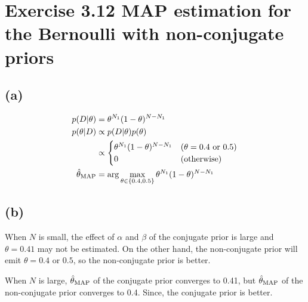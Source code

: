 \documentclass{jsarticle}
\begin{document}
\section*{Exercise 3.12 MAP estimation for the Bernoulli with non-conjugate priors}
\subsection*{(a)}
\begin{align}
p(D|\theta) & = \theta^{N_1}(1-\theta)^{N-N_1}\\
p(\theta|D) & \propto p(D|\theta)p(\theta)\\
& \propto \begin{cases}
\theta^{N_1}(1-\theta)^{N-N_1} & (\theta = 0.4\ {\rm or}\ 0.5)\\
0 & (\rm otherwise)
\end{cases}\\
\hat{\theta}_{\rm MAP}&=\arg \max_{\theta \in \{0.4, 0.5\}}\theta^{N_1}(1-\theta)^{N-N_1}
\end{align}
\subsection*{(b)}
When $N$ is small, the effect of $\alpha$ and $\beta$ of the conjugate prior is large and $\theta=0.41$ may not be estimated. On the other hand, the non-conjugate prior will emit $\theta=0.4$ or $0.5$, so the non-conjugate prior is better.

When $N$ is large, $\hat{\theta}_{\rm MAP}$ of the conjugate prior converges to 0.41, but $\hat{\theta}_{\rm MAP}$ of the non-conjugate prior converges to 0.4. Since, the conjugate prior is better.
\end{document}
